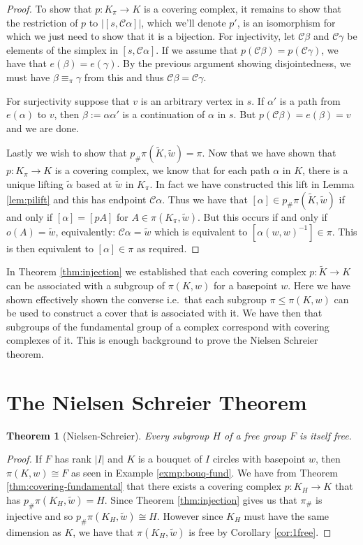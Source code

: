 \documentclass[12pt]{article}
\newtheorem{theorem}{Theorem}
\theoremstyle{definition}
\numberwithin{equation}{theorem}
\begin{document}
\begin{proof}
  To show that $p:K_{\pi}\rightarrow K$ is a covering complex, it remains to show that the restriction of $p$ to $|[s,\mathcal{C}\alpha]|$, which we'll denote $p'$, is an isomorphism for which we just need to show that it is a bijection. For injectivity, let $\mathcal{C}\beta$ and $\mathcal{C}\gamma$ be elements of the simplex in $[s,\mathcal{C}\alpha]$. If we assume that $p(\mathcal{C}\beta) = p(\mathcal{C}\gamma)$, we have that $e(\beta) = e(\gamma)$. By the previous argument showing disjointedness, we must have $\beta \equiv_\pi \gamma$ from this and thus $\mathcal{C}\beta = \mathcal{C}\gamma$.

  For surjectivity suppose that $v$ is an arbitrary vertex in $s$. If $\alpha'$ is a path from $e(\alpha)$ to $v$, then $\beta := \alpha\alpha'$ is a continuation of $\alpha$ in $s$. But $p(\mathcal{C}\beta) = e(\beta) = v$ and we are done.

  Lastly we wish to show that $p_{\#}\pi(\tilde{K},\tilde{w}) = \pi$. Now that we have shown that $p:K_{\pi}\rightarrow K$ is a covering complex, we know that for each path $\alpha$ in $K$, there is a unique lifting $\tilde{\alpha}$ based at $\tilde{w}$ in $K_{\pi}$. In fact we have constructed this lift in Lemma \ref{lem:pilift} and this has endpoint $\mathcal{C}\alpha$. Thus we have that $[\alpha] \in p_{\#}\pi(\tilde{K},\tilde{w})$ if and only if $[\alpha] = [pA]$ for $A \in \pi(K_\pi,\tilde{w})$. But this occurs if and only if $o(A) = \tilde{w}$, equivalently: $\mathcal{C}\alpha = \tilde{w}$ which is equivalent to $[\alpha(w,w)^{-1}] \in \pi$. This is then equivalent to $[\alpha] \in \pi$ as required.
\end{proof}

In Theorem \ref{thm:injection} we established that each covering complex $p:\tilde{K} \rightarrow K$ can be associated with a subgroup of $\pi(K,w)$ for a basepoint $w$. Here we have shown effectively shown the converse i.e.\ that each subgroup $\pi \leq \pi(K,w)$ can be used to construct a cover that is associated with it. We have then that subgroups of the fundamental group of a complex correspond with covering complexes of it. This is enough background to prove the Nielsen Schreier theorem.

\section{The Nielsen Schreier Theorem}
\begin{theorem}[Nielsen-Schreier]\label{thm:ns}
  Every subgroup $H$ of a free group $F$ is itself free.
\end{theorem}
\begin{proof}
  If $F$ has rank $|I|$ and $K$ is a bouquet of $I$ circles with basepoint $w$, then $\pi(K,w) \cong F$ as seen in Example \ref{exmp:bouq-fund}. We have from Theorem \ref{thm:covering-fundamental} that there exists a covering complex $p:K_H \rightarrow K$ that has $p_{\#}\pi(K_H,\tilde{w}) = H$. Since Theorem \ref{thm:injection} gives us that $\pi_{\#}$ is injective and so $p_{\#}\pi(K_H,\tilde{w}) \cong H$. However since $K_H$ must have the same dimension as $K$, we have that $\pi(K_H,\tilde{w})$ is free by Corollary \ref{cor:1free}.
\end{proof}
\end{document}
